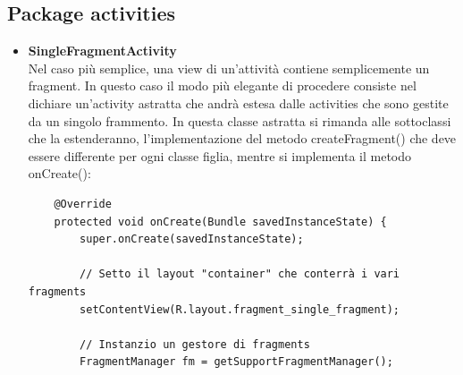\documentclass{article}
\begin{document}
\subsection{Package activities}
\begin{itemize} 
    \item \textbf{SingleFragmentActivity} \\
    Nel caso più semplice, una view di un’attività contiene semplicemente un fragment. In questo caso il modo più elegante di procedere
    consiste nel dichiare un'activity astratta che andrà estesa dalle activities che sono gestite da un singolo frammento.
    In questa classe astratta si rimanda alle sottoclassi che la estenderanno, l'implementazione del metodo createFragment() che deve essere
    differente per ogni classe figlia, mentre si implementa il metodo onCreate():
    \begin{lstlisting}
    @Override
    protected void onCreate(Bundle savedInstanceState) {
        super.onCreate(savedInstanceState);

        // Setto il layout "container" che conterrà i vari fragments
        setContentView(R.layout.fragment_single_fragment);

        // Instanzio un gestore di fragments
        FragmentManager fm = getSupportFragmentManager();


\end{lstlisting}
\end{itemize}
\end{document}
